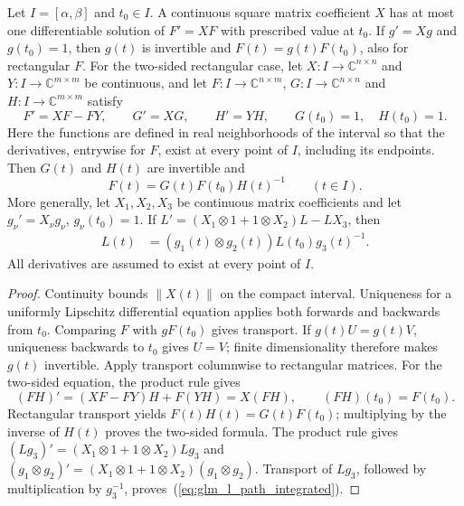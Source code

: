 \begin{lemma}
    \label{lem:glm_l_path_matrix_ode}
    \leanok
    Let $I=[\alpha,\beta]$ and $t_0\in I$. A continuous square matrix
    coefficient $X$ has at most one differentiable solution of $F'=XF$
    with prescribed value at $t_0$. If $g'=Xg$ and $g(t_0)=1$, then $g(t)$
    is invertible and $F(t)=g(t)F(t_0)$, also for rectangular $F$.
    For the two-sided rectangular case, let $X:I\to\mathbb C^{n\times n}$
    and $Y:I\to\mathbb C^{m\times m}$ be continuous, and let
    $F:I\to\mathbb C^{n\times m}$, $G:I\to\mathbb C^{n\times n}$ and
    $H:I\to\mathbb C^{m\times m}$ satisfy
    \[
        F'=XF-FY,\qquad G'=XG,\qquad H'=YH,\qquad G(t_0)=1,\quad H(t_0)=1.
    \]
    Here the functions are defined in real neighborhoods of the interval so
    that the derivatives, entrywise for $F$, exist at every point of $I$,
    including its endpoints. Then $G(t)$ and $H(t)$ are invertible and
    \[
        F(t)=G(t)F(t_0)H(t)^{-1}\qquad(t\in I).
    \]
    More generally, let $X_1,X_2,X_3$ be continuous matrix coefficients
    and let $g_\nu'=X_\nu g_\nu$, $g_\nu(t_0)=1$. If
    $L'= (X_1\otimes1+1\otimes X_2)L-LX_3$, then
    \begin{align}
        L(t) & =(g_1(t)\otimes g_2(t))L(t_0)g_3(t)^{-1}.
        \label{eq:glm_l_path_integrated}
    \end{align}
    All derivatives are assumed to exist at every point of $I$.
\end{lemma}
\begin{proof}
    \leanok
    Continuity bounds $\|X(t)\|$ on the compact interval. Uniqueness for a
    uniformly Lipschitz differential equation applies both forwards and
    backwards from $t_0$. Comparing $F$ with $gF(t_0)$ gives transport.
    If $g(t)U=g(t)V$, uniqueness backwards to $t_0$ gives $U=V$;
    finite dimensionality therefore makes $g(t)$ invertible.
    Apply transport columnwise to rectangular matrices. For the two-sided
    equation, the product rule gives
    \[
        (FH)'=(XF-FY)H+F(YH)=X(FH),\qquad (FH)(t_0)=F(t_0).
    \]
    Rectangular transport yields $F(t)H(t)=G(t)F(t_0)$; multiplying by
    the inverse of $H(t)$ proves the two-sided formula. The product rule
    gives $(Lg_3)'=(X_1\otimes1+1\otimes X_2)Lg_3$ and
    $(g_1\otimes g_2)'=(X_1\otimes1+1\otimes X_2)(g_1\otimes g_2)$.
    Transport of $Lg_3$, followed by multiplication by $g_3^{-1}$,
    proves~(\ref{eq:glm_l_path_integrated}).
\end{proof}
